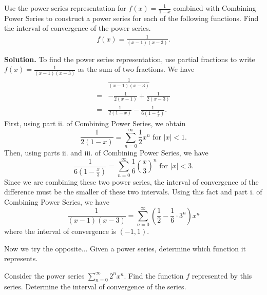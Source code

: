 \documentclass{report}
\begin{document}
    \bigbreak \noindent 
    \begin{eg}
        Use the power series representation for \( f(x) = \frac{1}{1 - x} \) combined with Combining Power Series to construct a power series for each of the following functions. Find the interval of convergence of the power series.
        \begin{align*}
            f(x)  =\frac{1}{(x-1)(x-3)}
        .\end{align*}
    \end{eg}
    \bigbreak \noindent 
    \textbf{Solution.}
    To find the power series representation, use partial fractions to write \( f(x) = \frac{1}{(x-1)(x-3)} \) as the sum of two fractions. We have
    \begin{align*}
        &\frac{1}{(x-1)(x-3)}  \\
        =&-\frac{1}{2(x-1)} + \frac{1}{2(x-3)} \\
        =&\frac{1}{2(1-x)} - \frac{1}{6(1-\frac{x}{3})}
    .\end{align*}
    First, using part ii. of Combining Power Series, we obtain
    \[
    \frac{1}{2(1-x)} = \sum_{n=0}^{\infty} \frac{1}{2} x^n \text{ for } |x| < 1.
    \]
    Then, using parts ii. and iii. of Combining Power Series, we have
    \[
    \frac{1}{6(1-\frac{x}{3})} = \sum_{n=0}^{\infty} \frac{1}{6} \left(\frac{x}{3}\right)^n \text{ for } |x| < 3.
    \]
    Since we are combining these two power series, the interval of convergence of the difference must be the smaller of these two intervals. Using this fact and part i. of Combining Power Series, we have
    \[
    \frac{1}{(x-1)(x-3)} = \sum_{n=0}^{\infty} \left(\frac{1}{2} - \frac{1}{6} \cdot 3^n\right) x^n
    \]
    where the interval of convergence is \((-1,1)\).

    \bigbreak \noindent 
    Now we try the opposite... Given a power series, determine which function it represents.
    \bigbreak \noindent 
    \begin{eg}
        Consider the power series \(\sum_{n=0}^{\infty} 2^n x^n\). Find the function \( f \) represented by this series. Determine the interval of convergence of the series.
    \end{eg}

    \bigbreak \noindent 
\end{document}
